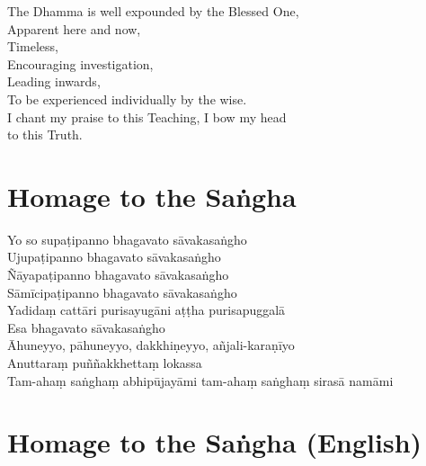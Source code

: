 \begin{leader}
\end{leader}

The Dhamma is well expounded by the Blessed One,\\
Apparent here and now,\\
Timeless,\\
Encouraging investigation,\\
Leading inwards,\\
To be experienced individually by the wise.\\
I chant my praise to this Teaching, I bow my head\\ to this Truth.

\section*{Homage to the Saṅgha}

\begin{leader}
\end{leader}

Yo so supaṭipanno bhagavato sāvakasaṅgho\\
Ujupaṭipanno bhagavato sāvakasaṅgho\\
Ñāyapaṭipanno bhagavato sāvakasaṅgho\\
Sāmīcipaṭipanno bhagavato sāvakasaṅgho\\
Yadidaṃ cattāri purisayugāni aṭṭha purisapuggalā\\
Esa bhagavato sāvakasaṅgho\\
Āhuneyyo, pāhuneyyo, dakkhiṇeyyo, añjali-karaṇīyo\\
Anuttaraṃ puññakkhettaṃ lokassa\\
Tam-ahaṃ saṅghaṃ abhipūjayāmi tam-ahaṃ saṅghaṃ sirasā namāmi

\section*{Homage to the Saṅgha (English)}

\begin{leader}
\end{leader}


